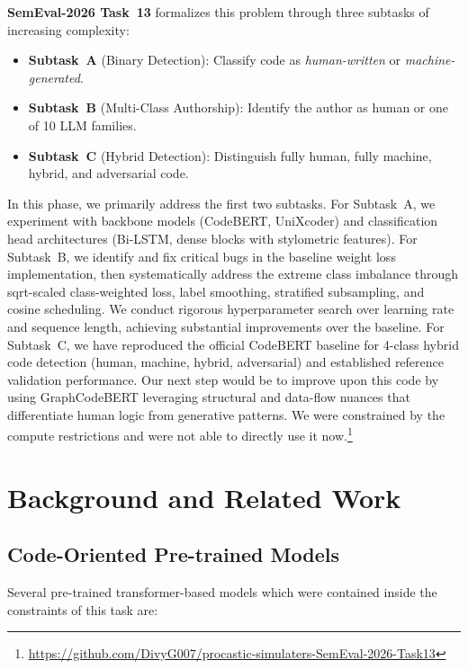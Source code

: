 \documentclass[11pt]{article}
\begin{document}
\textbf{SemEval-2026 Task~13} \cite{orel-etal-2025-codet} formalizes this problem through three subtasks of increasing complexity:
\begin{itemize}
    \item \textbf{Subtask~A} (Binary Detection): Classify code as \textit{human-written} or \textit{machine-generated}.
    \item \textbf{Subtask~B} (Multi-Class Authorship): Identify the author as human or one of 10 LLM families.
    \item \textbf{Subtask~C} (Hybrid Detection): Distinguish fully human, fully machine, hybrid, and adversarial code.
\end{itemize}

In this phase, we primarily address the first two subtasks. For Subtask~A, we experiment with backbone models (CodeBERT, UniXcoder) and classification head architectures (Bi-LSTM, dense blocks with stylometric features). For Subtask~B, we identify and fix critical bugs in the baseline weight loss implementation, then systematically address the extreme class imbalance through sqrt-scaled class-weighted loss, label smoothing, stratified subsampling, and cosine scheduling. We conduct rigorous hyperparameter search over learning rate and sequence length, achieving substantial improvements over the baseline. For Subtask~C, we have reproduced the official CodeBERT baseline for 4-class hybrid code detection (human, machine, hybrid, adversarial) and established reference validation performance. Our next step would be to improve upon this code by using GraphCodeBERT leveraging structural and data-ﬂow
nuances that differentiate human logic from
generative patterns. We were constrained by the compute restrictions and were not able to directly use it now.\footnote{\url{https://github.com/DivyG007/procastic-simulaters-SemEval-2026-Task13}}

\section{Background and Related Work}
\label{sec:related}

\subsection{Code-Oriented Pre-trained Models}

Several pre-trained transformer-based models which were contained inside the constraints of this task are:
\end{document}
